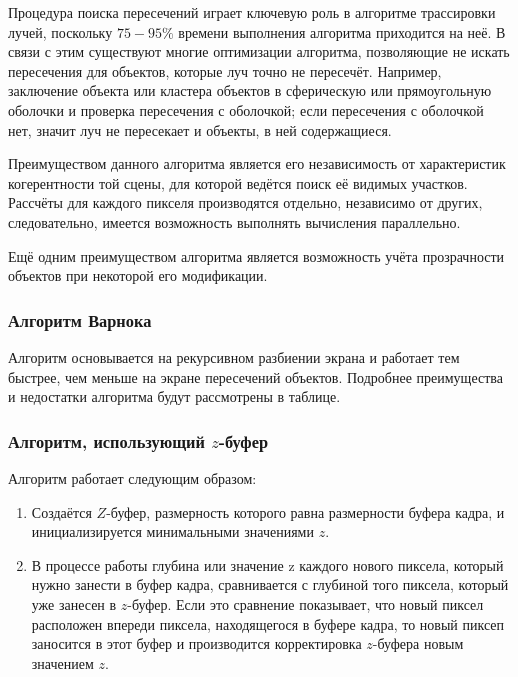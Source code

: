 Процедура поиска пересечений играет ключевую роль в алгоритме трассировки
лучей, поскольку $75-95\%$ времени выполнения алгоритма приходится на неё. В
связи с этим существуют многие оптимизации алгоритма, позволяющие не искать
пересечения для объектов, которые луч точно не пересечёт. Например, заключение
объекта или кластера объектов в сферическую или прямоугольную оболочки и
проверка пересечения с оболочкой; если пересечения с оболочкой нет, значит луч
не пересекает и объекты, в ней содержащиеся. \cite[с.~363]{rogers}

Преимуществом данного алгоритма является его независимость от характеристик
когерентности той сцены, для которой ведётся поиск её видимых участков.
Рассчёты для каждого пикселя производятся отдельно, независимо от других,
следовательно, имеется возможность выполнять вычисления параллельно.

Ещё одним преимуществом алгоритма является возможность учёта прозрачности
объектов при некоторой его модификации.

\subsubsection{Алгоритм Варнока}

Алгоритм основывается на рекурсивном разбиении экрана и работает тем быстрее,
чем меньше на экране пересечений объектов. Подробнее преимущества и недостатки
алгоритма будут рассмотрены в таблице.

\subsubsection{Алгоритм, использующий $z$-буфер}

Алгоритм работает следующим образом:
\begin{enumerate}
    \item Создаётся $Z$-буфер, размерность которого равна размерности буфера
        кадра, и инициализируется минимальными значениями $z$.
    \item В процессе работы глубина или значение z каждого нового пиксела,
        который нужно занести в буфер кадра, сравнивается с глубиной того
        пиксела, который уже занесен в $z$-буфер. Если это сравнение
        показывает, что новый пиксел расположен впереди пиксела, находящегося в
        буфере кадра, то новый пиксеп заносится в этот буфер и производится
        корректировка $z$-буфера новым значением $z$. \cite[с.~321]{rogers}
\end{enumerate}

